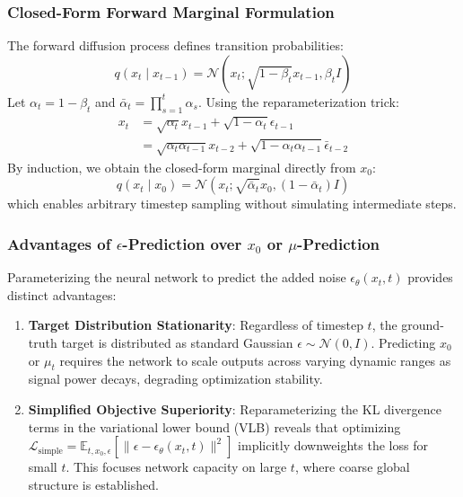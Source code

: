 \documentclass[10pt,journal,compsoc]{IEEEtran}
\begin{document}
\subsubsection{Closed-Form Forward Marginal Formulation}
The forward diffusion process defines transition probabilities:
\begin{equation}
q(x_t \mid x_{t-1}) = \mathcal{N}(x_t; \sqrt{1 - \beta_t} x_{t-1}, \beta_t I)
\end{equation}
Let $\alpha_t = 1 - \beta_t$ and $\bar{\alpha}_t = \prod_{s=1}^t \alpha_s$. Using the reparameterization trick:
\begin{align}
x_t &= \sqrt{\alpha_t} x_{t-1} + \sqrt{1 - \alpha_t} \epsilon_{t-1} \nonumber \\
&= \sqrt{\alpha_t \alpha_{t-1}} x_{t-2} + \sqrt{1 - \alpha_t \alpha_{t-1}} \bar{\epsilon}_{t-2}
\end{align}
By induction, we obtain the closed-form marginal directly from $x_0$:
\begin{equation}
q(x_t \mid x_0) = \mathcal{N}(x_t; \sqrt{\bar{\alpha}_t} x_0, (1 - \bar{\alpha}_t) I)
\end{equation}
which enables arbitrary timestep sampling without simulating intermediate steps.

\subsubsection{Advantages of $\epsilon$-Prediction over $x_0$ or $\mu$-Prediction}
Parameterizing the neural network to predict the added noise $\epsilon_\theta(x_t, t)$ provides distinct advantages:
\begin{enumerate}
    \item \textbf{Target Distribution Stationarity}: Regardless of timestep $t$, the ground-truth target is distributed as standard Gaussian $\epsilon \sim \mathcal{N}(0, I)$. Predicting $x_0$ or $\mu_t$ requires the network to scale outputs across varying dynamic ranges as signal power decays, degrading optimization stability.
    \item \textbf{Simplified Objective Superiority}: Reparameterizing the KL divergence terms in the variational lower bound (VLB) reveals that optimizing $\mathcal{L}_{\text{simple}} = \mathbb{E}_{t, x_0, \epsilon} [\|\epsilon - \epsilon_\theta(x_t, t)\|^2]$ implicitly downweights the loss for small $t$. This focuses network capacity on large $t$, where coarse global structure is established.
\end{enumerate}
\end{document}
